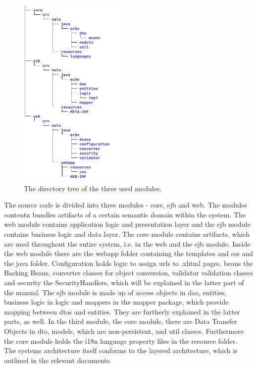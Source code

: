 \documentclass{article}
\begin{document}
\begin{figure}[h]
\caption{The directory tree of the three used modules.}
\centering
\includegraphics[width=200px]{structure}
\end{figure}
The source code is divided into three modules - core, ejb and web. The modules contentn bundles artifacts of a certain semantic domain within the system. The web module contains application logic and presentation layer and the ejb module contains business logic and data layer. The core module contains artifacts, which are used throughout the entire system, i.e. in the web and the ejb module. Inside the web module there are the webapp folder containing the templates and css and the java folder. Configuration holds logic to assign urls to .xhtml pages, beans the Backing Beans, converter classes for object conversion, validator validation classes and security the SecurityHandlers, which will be explained in the latter part of the manual. The ejb module is made up of access objects in dao, entities, business logic in logic and mappers in the mapper package, which provide mapping between dtos and entities. They are furtherly explained in the latter parts, as well. In the third module, the core module, there are Data Transfer Objects in dto, models, which are non-persistent, and util classes. Furthermore the core module holds the i18n language property files in the resource folder.\\
The systems architecture itself conforms to the layered architecture, which is outlined in the relevant documents. 
\end{document}
